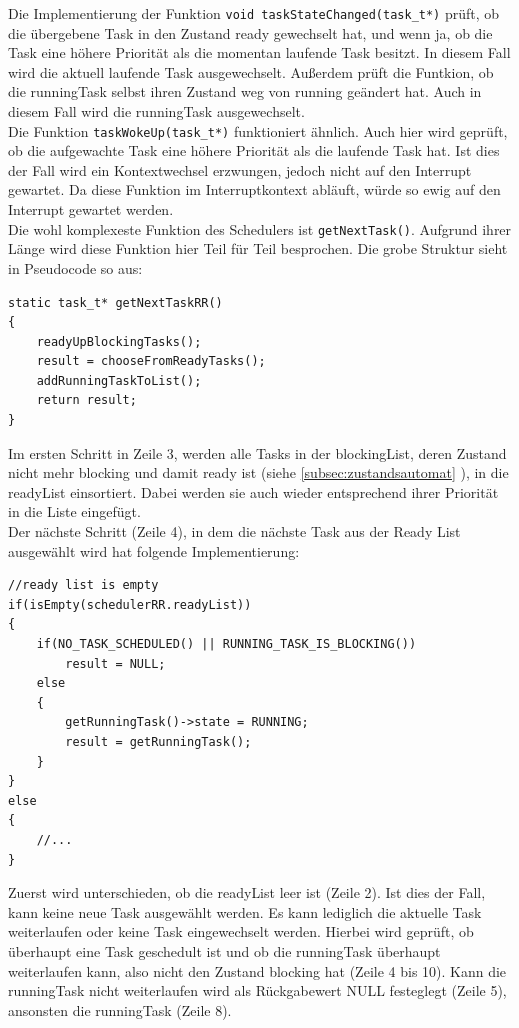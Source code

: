 \documentclass[fontsize=12pt, toc=bibliography, notitlepage]{scrreprt}
\newcommand{\refnn}[1]{\ref{#1} \nameref{#1}}
\begin{document}
Die Implementierung der Funktion \lstinline$void taskStateChanged(task_t*)$ prüft, ob die übergebene Task in den Zustand ready gewechselt hat, und wenn ja, ob die Task eine höhere Priorität als die momentan laufende Task besitzt. In diesem Fall wird die aktuell laufende Task ausgewechselt. Außerdem prüft die Funtkion, ob die runningTask selbst ihren Zustand weg von running geändert hat. Auch in diesem Fall wird die runningTask ausgewechselt.\\

Die Funktion \lstinline$taskWokeUp(task_t*)$ funktioniert ähnlich. Auch hier wird geprüft, ob die aufgewachte Task eine höhere Priorität als die laufende Task hat. Ist dies der Fall wird ein Kontextwechsel erzwungen, jedoch nicht auf den Interrupt gewartet. Da diese Funktion im Interruptkontext abläuft, würde so ewig auf den Interrupt gewartet werden.\\

Die wohl komplexeste Funktion des Schedulers ist \lstinline$getNextTask()$. Aufgrund ihrer Länge wird diese Funktion hier Teil für Teil besprochen. Die grobe Struktur sieht in Pseudocode so aus:

\begin{lstlisting}
static task_t* getNextTaskRR()
{
	readyUpBlockingTasks();
	result = chooseFromReadyTasks();
	addRunningTaskToList();
	return result;
}
\end{lstlisting}

Im ersten Schritt in Zeile 3, werden alle Tasks in der blockingList, deren Zustand nicht mehr blocking und damit ready ist (siehe \refnn{subsec:zustandsautomat}), in die readyList einsortiert. Dabei werden sie auch wieder entsprechend ihrer Priorität in die Liste eingefügt.\\

Der nächste Schritt (Zeile 4), in dem die nächste Task aus der Ready List ausgewählt wird hat folgende Implementierung:

\begin{lstlisting}[title=schedulerRR.c]
//ready list is empty
if(isEmpty(schedulerRR.readyList))
{
	if(NO_TASK_SCHEDULED() || RUNNING_TASK_IS_BLOCKING())
		result = NULL;
	else
	{
		getRunningTask()->state = RUNNING;
		result = getRunningTask();
	}
}
else
{
	//...
}
\end{lstlisting}

Zuerst wird unterschieden, ob die readyList leer ist (Zeile 2). Ist dies der Fall, kann keine neue Task ausgewählt werden. Es kann lediglich die aktuelle Task weiterlaufen oder keine Task eingewechselt werden. Hierbei wird geprüft, ob überhaupt eine Task geschedult ist und ob die runningTask überhaupt weiterlaufen kann, also nicht den Zustand blocking hat (Zeile 4 bis 10). Kann die runningTask nicht weiterlaufen wird als Rückgabewert NULL festeglegt (Zeile 5), ansonsten die runningTask (Zeile 8).\\
\end{document}
